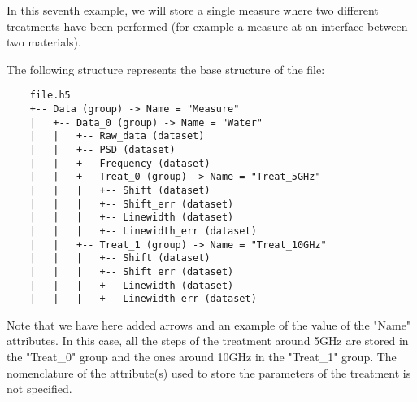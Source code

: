 In this seventh example, we will store a single measure where two different treatments have been performed (for example a measure at an interface between two materials).

The following structure represents the base structure of the file:
\begin{verbatim}
    file.h5
    +-- Data (group) -> Name = "Measure"
    |   +-- Data_0 (group) -> Name = "Water"
    |   |   +-- Raw_data (dataset)
    |   |   +-- PSD (dataset)
    |   |   +-- Frequency (dataset)
    |   |   +-- Treat_0 (group) -> Name = "Treat_5GHz"
    |   |   |   +-- Shift (dataset)
    |   |   |   +-- Shift_err (dataset)
    |   |   |   +-- Linewidth (dataset)
    |   |   |   +-- Linewidth_err (dataset)
    |   |   +-- Treat_1 (group) -> Name = "Treat_10GHz"
    |   |   |   +-- Shift (dataset)
    |   |   |   +-- Shift_err (dataset)
    |   |   |   +-- Linewidth (dataset)
    |   |   |   +-- Linewidth_err (dataset)
\end{verbatim}
Note that we have here added arrows and an example of the value of the "Name" attributes.
In this case, all the steps of the treatment around 5GHz are stored in the "Treat\_0" group and the ones around 10GHz in the "Treat\_1" group. The nomenclature of the attribute(s) used to store the parameters of the treatment is not specified.